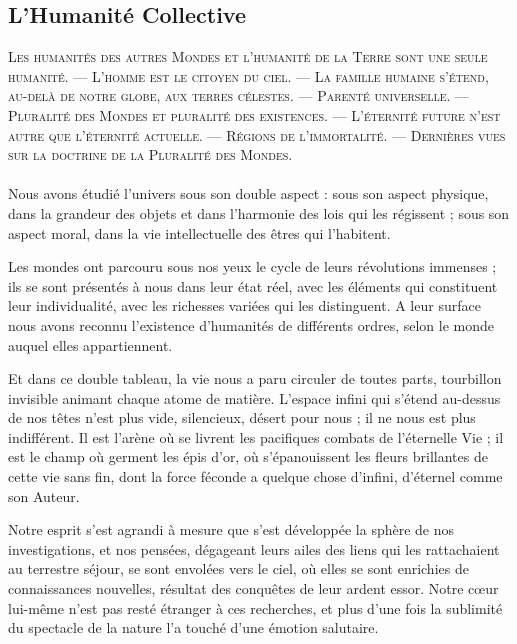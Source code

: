 \documentclass[a4paper, 11pt, oneside]{article}
\begin{document}
\subsection{L'Humanité Collective}
\begin{center}
\scshape
\small
Les humanités des autres Mondes et l'humanité de la Terre sont une seule humanité. --- L'homme est le citoyen du ciel. --- La famille humaine s'étend, au-delà de notre globe, aux terres célestes. --- Parenté universelle. --- Pluralité des Mondes et pluralité des existences. --- L'éternité future n'est autre que l'éternité actuelle. --- Régions de l'immortalité. --- Dernières vues sur la doctrine de la Pluralité des Mondes.
\end{center}
\paragraph{}
Nous avons étudié l'univers sous son double aspect : sous son aspect physique, dans la grandeur des objets et dans l'harmonie des lois qui les régissent ; sous son aspect moral, dans la vie intellectuelle des êtres qui l'habitent.

Les mondes ont parcouru sous nos yeux le cycle de leurs révolutions immenses ; ils se sont présentés à nous dans leur état réel, avec les éléments qui constituent leur individualité, avec les richesses variées qui les distinguent. A leur surface nous avons reconnu l'existence d'humanités de différents ordres, selon le monde auquel elles appartiennent.

Et dans ce double tableau, la vie nous a paru circuler de toutes parts, tourbillon invisible animant chaque atome de matière. L'espace infini qui s'étend au-dessus de nos têtes n'est plus vide, silencieux, désert pour nous ; il ne nous est plus indifférent. Il est l'arène où se livrent les pacifiques combats de l'éternelle Vie ; il est le champ où germent les épis d'or, où s'épanouissent les fleurs brillantes de cette vie sans fin, dont la force féconde a quelque chose d'infini, d'éternel comme son Auteur.

Notre esprit s'est agrandi à mesure que s'est développée la sphère de nos investigations, et nos pensées, dégageant leurs ailes des liens qui les rattachaient au terrestre séjour, se sont envolées vers le ciel, où elles se sont enrichies de connaissances nouvelles, résultat des conquêtes de leur ardent essor. Notre cœur lui-même n'est pas resté étranger à ces recherches, et plus d'une fois la sublimité du spectacle de la nature l'a touché d'une émotion salutaire.
\end{document}
